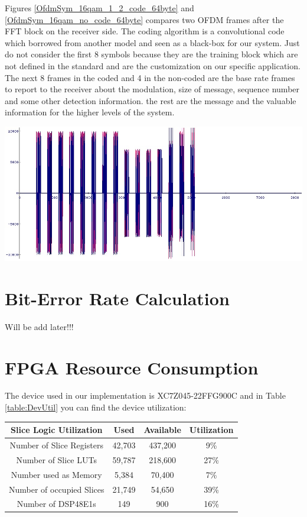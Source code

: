 Figures \ref{OfdmSym_16qam_1_2_code_64byte} and \ref{OfdmSym_16qam_no_code_64byte} compares two OFDM frames after the FFT block on the receiver side. The coding algorithm is a convolutional code which borrowed from another model and seen as a black-box for our system. Just do not consider the first 8 symbols because they are the training block which are not defined in the standard and are the customization on our specific application. The next 8 frames in the coded and 4 in the non-coded are the base rate frames to report to the receiver about the modulation, size of message, sequence number and some other detection information. the rest are the message and the valuable information for the higher levels of the system.\\

\begin{center}
\includegraphics[width=\textwidth]{content/fig/OfdmSym_16qam_no_code_64byte.JPG}
\label{OfdmSym_16qam_no_code_64byte}
\end{center}

\section{Bit-Error Rate Calculation}
Will be add later!!!


\section{FPGA Resource Consumption}
The device used in our implementation is  XC7Z045-22FFG900C and in Table \ref{table:DevUtil} you can find the device utilization:\\


\begin{center}
\label{table:DevUtil}
\vspace{0.5cm}
\begin{tabular}{c|c|c|c}
Slice Logic Utilization&Used&Available&Utilization\\ \hline
Number of Slice Registers&42,703&437,200&9\% \\
Number of Slice LUTs&59,787&218,600&27\% \\
Number used as Memory&5,384&70,400&7\% \\
Number of occupied Slices&21,749&54,650&39\% \\
Number of DSP48E1s&149&900&16\% \\
\end{tabular}
\end{center}

